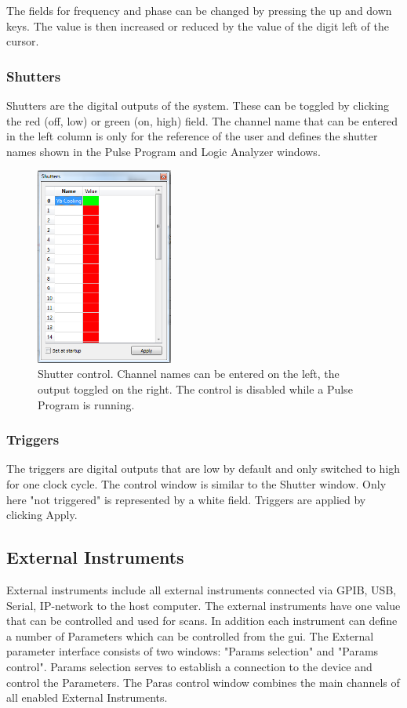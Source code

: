 \documentclass[11pt]{scrartcl}
\begin{document}
The fields for frequency and phase can be changed by pressing the up and down keys. The value is then increased or reduced by the value of the digit left of the cursor.

\subsubsection{Shutters}
Shutters are the digital outputs of the system. These can be toggled by clicking the red (off, low) or green (on, high) field. The channel name that can be entered in the left column is only for the reference of the user and defines the shutter names shown in the Pulse Program and Logic Analyzer windows.

\begin{figure}
\centering
\includegraphics[width=0.4\textwidth]{Shutters}
\caption{\label{Shutters} Shutter control. Channel names can be entered on the left, the output toggled on the right. The control is disabled while a Pulse Program is running.}
\end{figure}

\subsubsection{Triggers}
The triggers are digital outputs that are low by default and only switched to high for one clock cycle. The control window is similar to the Shutter window. Only here "not triggered" is represented by a white field. Triggers are applied by clicking Apply.

\subsection{External Instruments}
External instruments include all external instruments connected via GPIB, USB, Serial, IP-network to the host computer. The external instruments have one value that can be controlled and used for scans. In addition each instrument can define a number of Parameters which can be controlled from the gui. The External parameter interface consists of two windows: "Params selection" and "Params control". Params selection serves to establish a connection to the device and control the Parameters. The Paras control window combines the main channels of all enabled External Instruments.
\end{document}
